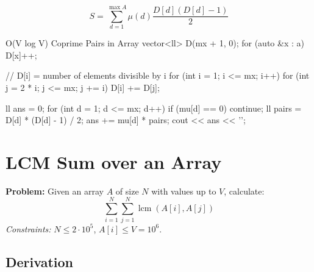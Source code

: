 \documentclass[11pt]{article}
\DeclareMathOperator{\lcm}{lcm}
\begin{document}
\begin{resultbox}
    \begin{equation}
        S = \sum_{d=1}^{\max A} \mu(d) \frac{D[d](D[d]-1)}{2}
    \end{equation}
\end{resultbox}

\begin{vscode}{O(V log V) Coprime Pairs in Array}
vector<ll> D(mx + 1, 0);
for (auto &x : a)
    D[x]++;

// D[i] = number of elements divisible by i
for (int i = 1; i <= mx; i++)
{
    for (int j = 2 * i; j <= mx; j += i)
        D[i] += D[j];
}

ll ans = 0;
for (int d = 1; d <= mx; d++)
{
    if (mu[d] == 0)
        continue;
    ll pairs = D[d] * (D[d] - 1) / 2;
    ans += mu[d] * pairs;
}
cout << ans << '\n';
\end{vscode}



\pagebreak
\section{LCM Sum over an Array}
\label{sec:lcm_array}

\textbf{Problem:} Given an array $A$ of size $N$ with values up to $V$, calculate:
\[ \sum_{i=1}^N \sum_{j=1}^N \lcm(A[i], A[j]) \]
\textit{Constraints:} $N \le 2 \cdot 10^5$, $A[i] \le V = 10^6$.

\subsection{Derivation}
\end{document}
